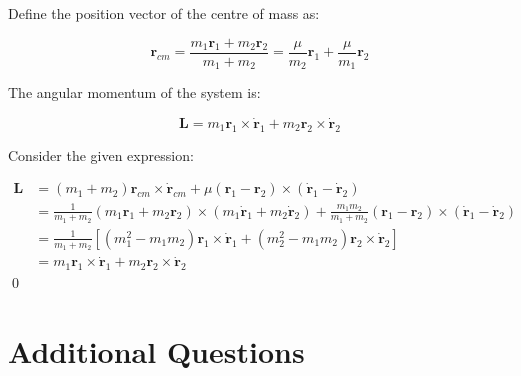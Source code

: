 \documentclass[12pt]{article}
\begin{document}
Define the position vector of the centre of mass as:

\begin{equation}
    \mathbf{r}_{cm} = \frac{m_{1} \mathbf{r}_{1} + m_{2} \mathbf{r}_{2}}{m_{1} + m_{2}} = \frac{\mu}{m_{2}} \mathbf{r}_{1} + \frac{\mu}{m_{1}} \mathbf{r}_{2}
\end{equation}

The angular momentum of the system is:

\begin{equation}
    \mathbf{L} = m_{1} \mathbf{r}_{1} \times \dot{\mathbf{r}}_{1} + m_{2} \mathbf{r}_{2} \times \dot{\mathbf{r}}_{2}
\end{equation}

Consider the given expression:

\begin{equation}
\begin{split}
    \mathbf{L} &= (m_{1} + m_{2}) \mathbf{r}_{cm} \times \dot{\mathbf{r}}_{cm} + \mu (\mathbf{r}_{1} - \mathbf{r}_{2}) \times (\dot{\mathbf{r}}_{1} - \dot{\mathbf{r}}_{2}) \\
    &= \frac{1}{m_{1} + m_{2}} (m_{1} \mathbf{r}_{1} + m_{2} \mathbf{r}_{2}) \times (m_{1} \dot{\mathbf{r}}_{1} + m_{2} \dot{\mathbf{r}}_{2}) + \frac{m_{1} m_{2}}{m_{1} + m_{2}} (\mathbf{r}_{1} - \mathbf{r}_{2}) \times (\dot{\mathbf{r}}_{1} - \dot{\mathbf{r}}_{2}) \\
    &= \frac{1}{m_{1} + m_{2}} \left[ (m_{1}^{2} - m_{1} m_{2}) \mathbf{r}_{1} \times \dot{\mathbf{r}}_{1} + (m_{2}^{2} - m_{1} m_{2}) \mathbf{r}_{2} \times \dot{\mathbf{r}}_{2} \right] \\
    &= m_{1} \mathbf{r}_{1} \times \dot{\mathbf{r}}_{1} + m_{2} \mathbf{r}_{2} \times \dot{\mathbf{r}}_{2}
\end{split}
\end{equation}
\qed

\pagebreak
\section*{Additional Questions}


\problem{}{}
\end{document}
